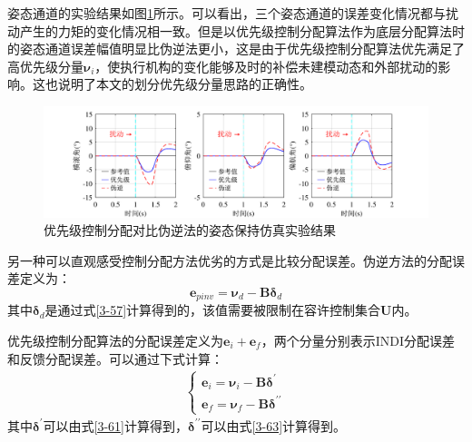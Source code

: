姿态通道的实验结果如图\ref{优先级伪逆姿态仿真}所示。可以看出，三个姿态通道的误差变化情况都与扰动产生的力矩的变化情况相一致。但是以优先级控制分配算法作为底层分配算法时的姿态通道误差幅值明显比伪逆法更小，这是由于优先级控制分配算法优先满足了高优先级分量$\boldsymbol{\nu}_i$，使执行机构的变化能够及时的补偿未建模动态和外部扰动的影响。这也说明了本文的划分优先级分量思路的正确性。
\begin{figure}[htbp]
	\centering
	\begin{minipage}[c]{1\textwidth}
        \centering
        \includegraphics[scale=1]{Fig/优先级对比伪逆的姿态保持仿真实验结果.pdf}
        \caption{\label{优先级伪逆姿态仿真}优先级控制分配对比伪逆法的姿态保持仿真实验结果}
        \end{minipage}
\end{figure}

另一种可以直观感受控制分配方法优劣的方式是比较分配误差。伪逆方法的分配误差定义为：
\begin{equation}
    \boldsymbol{e}_{pinv}=\boldsymbol{\nu}_d-\boldsymbol{B}\boldsymbol{\delta}_d
    \label{3-66}
\end{equation}
其中$\boldsymbol{\delta}_d$是通过式\eqref{3-57}计算得到的，该值需要被限制在容许控制集合$\boldsymbol{U}$内。

优先级控制分配算法的分配误差定义为$\boldsymbol{e}_{i}+\boldsymbol{e}_{f}$，两个分量分别表示INDI分配误差和反馈分配误差。可以通过下式计算：
\begin{equation}
    \begin{gathered}
        \begin{cases}
            \boldsymbol{e}_{i}=\boldsymbol{\nu}_i-\boldsymbol{B}\boldsymbol{\delta}^{\prime} \\
            \boldsymbol{e}_{f}=\boldsymbol{\nu}_f-\boldsymbol{B}\boldsymbol{\delta}^{\prime\prime}
        \end{cases}
    \end{gathered}
    \label{3-67}
\end{equation}
其中$\boldsymbol{\delta}^{\prime}$可以由式\eqref{3-61}计算得到，$\boldsymbol{\delta}^{\prime\prime}$可以由式\eqref{3-63}计算得到。

